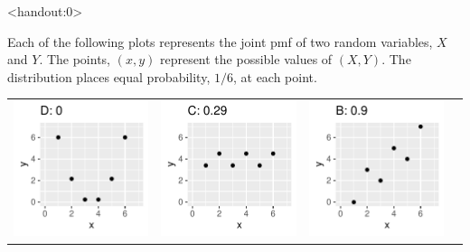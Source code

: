 \begin{frame}<handout:0>
  \begin{block}{\examplectd}
 Each of the following plots represents the joint pmf of two random variables, $X$ and $Y$. The points, $(x,y)$ represent the possible values of $(X,Y)$. The distribution places equal probability, $1/6$, at each point.

    \begin{center}
      \begin{tabular}{cccc}
        \includegraphics[height=.35\textheight]{figure/exercise-26-2b-4} &
        \includegraphics[height=.35\textheight]{figure/exercise-26-2b-3} &
        \includegraphics[height=.35\textheight]{figure/exercise-26-2b-2} &

\end{tabular}
\end{center}
\end{block}
\end{frame}
